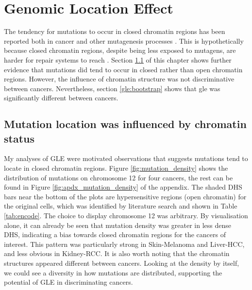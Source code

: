 \chapter{Genomic Location Effect}\label{gle}

The tendency for mutations to occur in closed \gls{chromatin} regions has been reported both in cancer and other mutagenesis processes \citep{Polak2015,Prendergast2007ChromatinGenome}. This is hypothetically because closed chromatin regions, despite being less exposed to mutagens, are harder for repair systems to reach \citep{Prendergast2007ChromatinGenome,Teng1997ExcisionSequences, Morse2002PhotoreactivationCerevisiae}. Section \ref{gle:chromatin} of this chapter shows further evidence that mutations did tend to occur in closed rather than open chromatin regions. However, the influence of chromatin structure was not discriminative between cancers. Nevertheless, section \ref{gle:bootstrap} shows that \gls{gle} was significantly different between cancers. 

\section{Mutation location was influenced by chromatin status}\label{gle:chromatin}
My analyses of GLE were motivated observations that suggests mutations tend to locate in closed chromatin regions. Figure \ref{fig:mutation_density} shows the distribution of mutations on chromosome 12 for four cancers, the rest can be found in Figure \ref{fig:apdx_mutation_density} of the appendix. The shaded DHS bars near the bottom of the plots are hypersensitive regions (open chromatin) for the original cells, which was identified by literature search and shown in Table \ref{tab:encode}. The choice to display chromosome 12 was arbitrary. By visualisation alone, it can already be seen that mutation density was greater in less dense DHS, indicating a bias towards closed chromatin regions for the cancers of interest. This pattern was particularly strong in Skin-Melanoma and Liver-HCC, and less obvious in Kidney-RCC. It is also worth noting that the chromatin structures appeared different between cancers. Looking at the density by itself, we could see a diversity in how mutations are distributed, supporting the potential of GLE in discriminating cancers. 



